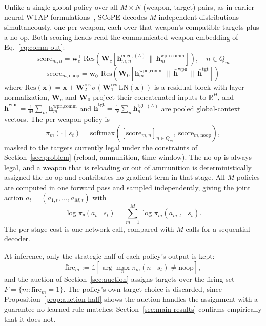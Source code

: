 Unlike a single global policy over all $M \times N$ (weapon, target) pairs, as in earlier neural WTAP formulations~\cite{na2023weapon}, SCoPE decodes $M$ independent distributions simultaneously, one per weapon, each over that weapon's compatible targets plus a no-op. Both scoring heads read the communicated weapon embedding of Eq.~\eqref{eq:comm-out}:
\begin{equation}
\label{eq:edge-score}
\text{score}_{m,n} = \bm{w}_e^\top \, \text{Res}\!\left(\bm{W}_c\!\left[\bm{h}_{m,n}^{\text{edge},(L)} \,\|\, \bm{h}_m^{\text{wpn,comm}}\right]\right), \quad n \in Q_m
\end{equation}
\begin{equation}
\label{eq:noop-score}
\text{score}_{m,\text{noop}} = \bm{w}_0^\top \, \text{Res}\!\left(\bm{W}_0\left[\bm{h}_m^{\text{wpn,comm}} \,\|\, \bar{\bm{h}}^{\text{wpn}} \,\|\, \bar{\bm{h}}^{\text{tgt}}\right]\right)
\end{equation}
where $\text{Res}(\bm{x}) = \bm{x} + \bm{W}_2^{\text{res}}\,\sigma(\bm{W}_1^{\text{res}}\,\text{LN}(\bm{x}))$ is a residual block with layer normalization, $\bm{W}_c$ and $\bm{W}_0$ project their concatenated inputs to $\mathbb{R}^H$, and $\bar{\bm{h}}^{\text{wpn}} = \frac{1}{M}\sum_m \bm{h}_m^{\text{wpn,comm}}$ and $\bar{\bm{h}}^{\text{tgt}} = \frac{1}{N}\sum_n \bm{h}_n^{\text{tgt},(L)}$ are pooled global-context vectors. The per-weapon policy is
\begin{equation}
\label{eq:parallel-policy}
\pi_m(\cdot \mid s_t) = \text{softmax}\!\left(\left[\text{score}_{m,n}\right]_{n \in Q_m},\ \text{score}_{m,\text{noop}}\right),
\end{equation}
masked to the targets currently legal under the constraints of Section~\ref{sec:problem} (reload, ammunition, time window). The no-op is always legal, and a weapon that is reloading or out of ammunition is deterministically assigned the no-op and contributes no gradient term in that stage. All $M$ policies are computed in one forward pass and sampled independently, giving the joint action $a_t = (a_{1,t}, \ldots, a_{M,t})$ with
\begin{equation}
\log \pi_\theta(a_t \mid s_t) = \sum_{m=1}^{M} \log \pi_m(a_{m,t} \mid s_t).
\end{equation}
The per-stage cost is one network call, compared with $M$ calls for a sequential decoder.

At inference, only the strategic half of each policy's output is kept:
\begin{equation}
\text{fire}_m := \mathbb{1}\!\left[\arg\max_n \pi_m(n \mid s_t) \neq \text{noop}\right],
\end{equation}
and the auction of Section~\ref{sec:auction} assigns targets over the firing set $F = \{m : \text{fire}_m = 1\}$. The policy's own target choice is discarded, since Proposition~\ref{prop:auction-half} shows the auction handles the assignment with a guarantee no learned rule matches; Section~\ref{sec:main-results} confirms empirically that it does not.

